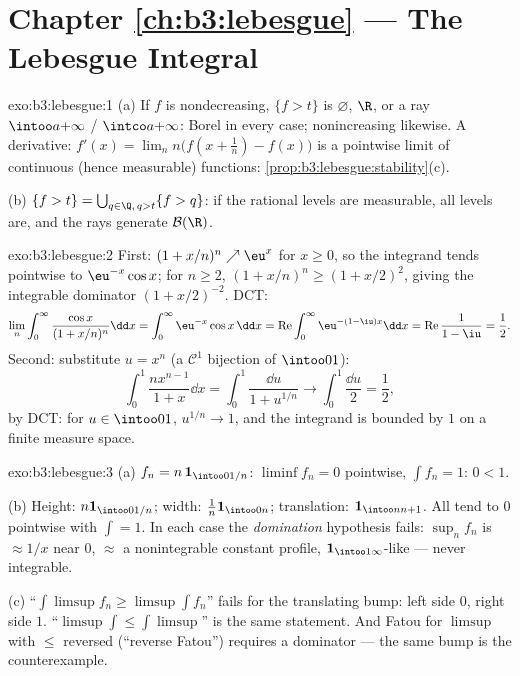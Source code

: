 \section*{Chapter \ref{ch:b3:lebesgue} --- The Lebesgue
Integral}

\begin{solution}{exo:b3:lebesgue:1}
(a) If $f$ is nondecreasing, $\{f > t\}$ is $\varnothing$, $\R$,
or a ray $\intoo a{+\infty}$ / $\intco a{+\infty}$: Borel in
every case; nonincreasing likewise. A derivative: $f'(x) =
\lim_n n\bigl(f(x + \frac1n) - f(x)\bigr)$ is a pointwise limit
of continuous (hence measurable) functions:
\cref{prop:b3:lebesgue:stability}(c).

(b) $\{f > t\} = \bigcup_{q \in \Q,\, q > t}\{f > q\}$: if the
rational levels are measurable, all levels are, and the rays
generate $\mathcal B(\R)$.
\end{solution}

\begin{solution}{exo:b3:lebesgue:2}
First: $(1 + x/n)^n \nearrow \eu^x$ for $x \geq 0$, so the
integrand tends pointwise to $\eu^{-x}\cos x$; for $n \geq 2$,
$(1 + x/n)^n \geq (1 + x/2)^2$, giving the integrable dominator
$(1 + x/2)^{-2}$. DCT:
\[
\lim_n\int_0^\infty\frac{\cos x}{(1 + x/n)^n}\dd x
= \int_0^\infty \eu^{-x}\cos x\,\dd x
= \operatorname{Re}\int_0^\infty\eu^{-(1 - \iu)x}\dd x
= \operatorname{Re}\frac{1}{1 - \iu} = \frac12 .
\]
Second: substitute $u = x^n$ (a $\mathcal C^1$ bijection of
$\intoo01$):
\[
\int_0^1\frac{nx^{n-1}}{1 + x}\dd x = \int_0^1\frac{\dd u}{1 +
u^{1/n}} \longrightarrow \int_0^1\frac{\dd u}{2} = \frac12,
\]
by DCT: for $u \in \intoo01$, $u^{1/n} \to 1$, and the
integrand is bounded by $1$ on a finite measure space.
\end{solution}

\begin{solution}{exo:b3:lebesgue:3}
(a) $f_n = n\,\mathbf 1_{\intoo0{1/n}}$: $\liminf f_n = 0$
pointwise, $\int f_n = 1$: $0 < 1$.

(b) Height: $n\mathbf 1_{\intoo0{1/n}}$; width: $\frac1n\mathbf
1_{\intoo0n}$; translation: $\mathbf 1_{\intoo n{n+1}}$. All
tend to $0$ pointwise with $\int = 1$. In each case the
\emph{domination} hypothesis fails: $\sup_nf_n$ is
$\approx 1/x$ near $0$, $\approx$ a nonintegrable constant
profile, $\mathbf 1_{\intoo1\infty}$-like --- never integrable.

(c) ``$\int\limsup f_n \geq \limsup\int f_n$'' fails for the
translating bump: left side $0$, right side $1$.
``$\limsup\int \leq \int\limsup$'' is the same statement. And
Fatou for $\limsup$ with $\leq$ reversed
(``reverse Fatou'') requires a dominator --- the same bump is
the counterexample.
\end{solution}


